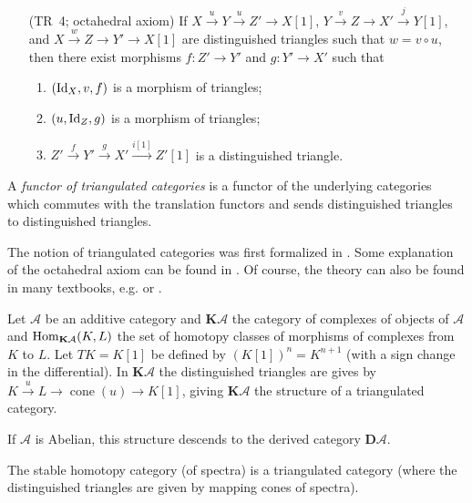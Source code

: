 \documentclass[english]{short-notes}
\newcommand\derived{\mathbf D}
\renewcommand\cat{\mathcal}
\begin{document}
\begin{Def}
\begin{enumerate}
            \item[(TR~4; octahedral axiom)]
                If $X \xrightarrow{u} Y \xrightarrow{u} Z' → X[1]$,
                $Y \xrightarrow{v} Z \xrightarrow{} X' \xrightarrow{j} Y[1]$, and
                $X \xrightarrow{w} Z \xrightarrow{} Y' \xrightarrow{} X[1]$
                are distinguished triangles such that $w = v∘u$, then there exist morphisms $f\colon Z' → Y'$ and $g\colon Y' → X'$ such that
                \begin{enumerate}[1)]
                    \item $(\id[X],v,f)$ is a morphism of triangles;
                    \item $(u, \id[Z],g)$ is a morphism of triangles;
                    \item $Z' \xrightarrow{f} Y' \xrightarrow{g} X' \xrightarrow{i[1]} Z'[1]$ is a distinguished triangle.
                \end{enumerate}
    \end{enumerate}
    A \emph{functor of triangulated categories} is a functor of the underlying categories which commutes with the translation functors and sends distinguished triangles to distinguished triangles.
\end{Def}

The notion of triangulated categories was first formalized in \cite{Verdier:1977:CategoriesDerivees}.
Some explanation of the octahedral axiom can be found in \cite[Section~1.1]{BeilinsonBernsteinDeligne:1982:FaisceauxPervers}.
Of course, the theory can also be found in many textbooks, e.g. \cite{KashiwaraSchapira:2006:CategoriesAndSheaves} or \cite{Weibel:1994:IntroToHomologicalAlgebra}.

\begin{Ex}
    Let $\cat A$ be an additive category and $\mathbf K\cat A$ the category of complexes of objects of $\cat A$ and $\Hom_{\mathbf K\cat A}(K,L)$ the set of homotopy classes of morphisms of complexes from $K$ to $L$.
    Let $TK = K[1]$ be defined by $(K[1])^n = K^{n+1}$ (with a sign change in the differential).
    In $\mathbf K\cat A$ the distinguished triangles are gives by $K \xrightarrow{u} L → \operatorname{cone}(u) → K[1]$, giving $\mathbf K\cat A$ the structure of a triangulated category.

    If $\cat A$ is Abelian, this structure descends to the derived category $\derived \cat A$.
\end{Ex}

\begin{Ex}
    The stable homotopy category (of spectra) is a triangulated category (where the distinguished triangles are given by mapping cones of spectra).
\end{Ex}
\end{document}
